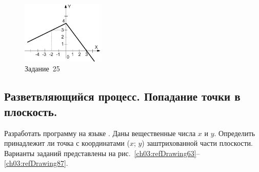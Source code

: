 
\begin{figure}[h]
\begin{center}
\includegraphics[width=0.35\textwidth]{img/ris_3_63}
\caption{Задание~25}
\label{ch03:refDrawing62}
\end{center}
\end{figure}

\subsection[Разветвляющийся процесс. Попадание точки в плоскость.]{Разветвляющийся процесс. Попадание точки в
плоскость.}
Разработать программу на языке . Даны вещественные числа $x$ и $y$. Определить
принадлежит ли точка с координатами ($x$; $y$) заштрихованной части плоскости.
Варианты заданий представлены на рис.~\ref{ch03:refDrawing63}--\ref{ch03:refDrawing87}.

